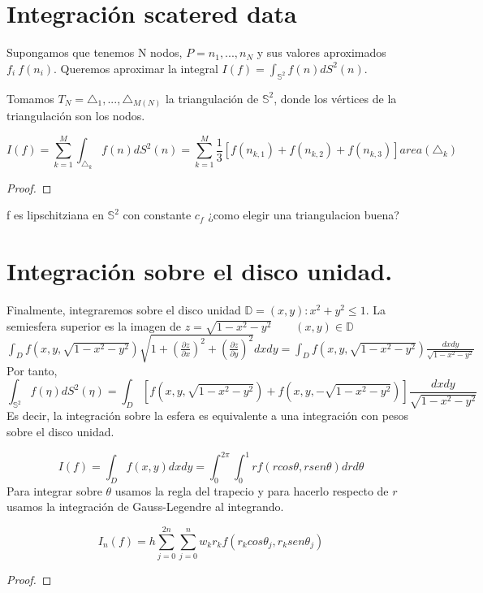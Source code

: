 \section{Integración scatered data}
Supongamos que tenemos N nodos, $P={n_1,...,n_N}$ y sus valores aproximados $f_i~f(n_i)$. Queremos aproximar la integral $I(f) =  \int_{\mathds{S}^2} f(n)dS^2(n)$.

\medskip
Tomamos $T_N={\triangle_1,...,\triangle_{M(N)}}$ la triangulación de $\mathds{S}^2$, donde los vértices de la triangulación son los nodos.

$$
I(f) = \sum_{k=1}^{M} \int_{\triangle_k} f(n)dS^2(n) =  \sum_{k=1}^{M} \frac{1}{3}[f(n_{k,1})+f(n_{k,2})+f(n_{k,3})] area(\triangle_k)
$$

\begin{thm}
\end{thm}
\begin{proof}
\end{proof}

f es lipschitziana en $\mathds{S}^2$ con constante $ c_f$
¿como elegir una triangulacion buena?
\section{Integración sobre el disco unidad.}
Finalmente, integraremos sobre el disco unidad $\mathds{D}={(x,y):x^2+y^2 \le 1}.$
La semiesfera superior es la imagen de 
$z=\sqrt{1-x^2-y^2} \qquad (x,y)\in \mathds{D}$
$\int_{D}f(x,y,\sqrt{1-x^2-y^2})\sqrt{1+(\frac{\partial z}{\partial x})^2+(\frac{\partial z}{\partial y})^2} dx dy = \int_D f(x,y,\sqrt{1-x^2-y^2})\frac{dx dy}{\sqrt{1-x^2-y^2}}$
Por tanto,
$$ \int_{\mathds{S}^2}f(\eta) dS^2(\eta) = \int_D \left[f(x,y,\sqrt{1-x^2-y^2})+f(x,y,-\sqrt{1-x^2-y^2})\right]\frac{dx dy}{\sqrt{1-x^2-y^2}} $$
Es decir, la integración sobre la esfera es equivalente a una integración con pesos sobre el disco unidad.


$$I(f)=\int_{D} f(x,y) dxdy = \int_{0}^{2\pi}\int_{0}^{1} rf(rcos\theta,rsen\theta)drd\theta $$
Para integrar sobre $\theta$ usamos la regla del trapecio y para hacerlo respecto de $r$ usamos la integración de Gauss-Legendre al integrando.

$$ I_n(f) = h\sum_{j=0}^{2n}\sum_{j=0}^{n} w_k r_k f(r_k cos\theta_j,r_ksen\theta_j)$$
\begin{thm}
\end{thm}
\begin{proof}
\end{proof}